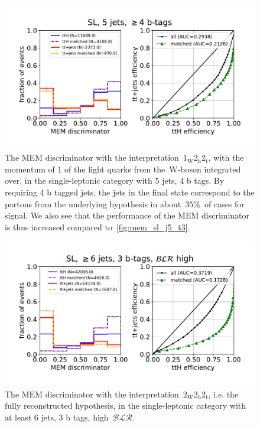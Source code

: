 \begin{figure}
\begin{centering}
\includegraphics[width = 1.0\textwidth]{figures/mem_sl_j5_tge4.pdf}
\caption{The MEM discriminator with the interpretation~$1_{\mathrm{W}} 2_{\mathrm{h}} 2_{\mathrm{t}}$, with the momentum of 1 of the light quarks from the~$\mathrm{W}$-boson integrated over, in the single-leptonic category with 5 jets, 4 b tags. By requiring 4 b tagged jets, the jets in the final state correspond to the partons from the underlying hypothesis in about~$35\%$~of cases for signal. We also see that the performance of the MEM discriminator is thus increased compared to~\cref{fig:mem_sl_j5_t3}.}
\label{fig:mem_sl_j5_t4}
\end{centering}
\end{figure}

\begin{figure}
\begin{centering}
\includegraphics[width = 1.0\textwidth]{figures/mem_sl_jge6_t3_blrH.pdf}
\caption{The MEM discriminator with the interpretation~$2_{\mathrm{W}} 2_{\mathrm{h}} 2_{\mathrm{t}}$, i.e. the fully reconstructed hypothesis, in the single-leptonic category with at least 6 jets, 3 b tags, high~$\mathcal{BLR}$.}
\label{fig:mem_sl_jge6_t3}
\end{centering}
\end{figure}

